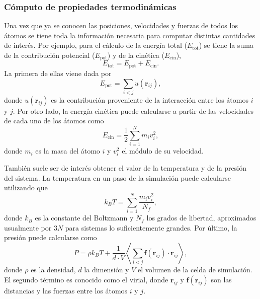

\subsubsection{Cómputo de propiedades termodinámicas}

Una vez que ya se conocen las posiciones, velocidades y fuerzas de todos los 
átomos se tiene toda la información necesaria para computar distintas cantidades 
de interés. Por ejemplo, para el cálculo de la energía total ($E_{\text{tot}}$) 
se tiene la suma de la contribución potencial ($E_{\text{pot}}$) y de la cinética
($E_{\text{cin}}$),
\begin{equation}
    E_{\text{tot}} = E_{\text{pot}} + E_{\text{cin}}.
\end{equation}
La primera de ellas viene dada por 
\begin{equation}
    E_{\text{pot}} = \sum_{i < j} u(\mathbf{r}_{ij}),
\end{equation}
donde $u(\mathbf{r}_{ij})$ es la contribución proveniente de la interacción 
entre los átomos $i$ y $j$. Por otro lado, la energía cinética puede calcularse a
partir de las velocidades de cada uno de los átomos como
\begin{equation}
    E_{\text{cin}} = \frac{1}{2} \sum_{i=1}^{N} m_i v_i^2, 
\end{equation}
donde $m_i$ es la masa del átomo $i$ y $v_i^2$ el módulo de su velocidad. 

También suele ser de interés obtener el valor de la temperatura y de la presión
del sistema. La temperatura en un paso de la simulación puede calcularse 
utilizando que
\begin{equation}\label{eq:tempvel}
    k_B T = \sum_{i=1}^N \frac{m_i v_i^2}{N_f},
\end{equation}
donde $k_B$ es la constante del Boltzmann y $N_f$ los grados de libertad,
aproximados usualmente por $3N$ para sistemas lo suficientemente grandes. Por 
último, la presión puede calcularse como 
\begin{equation}
P = \rho k_B T + \frac{1}{d \cdot V} \left\langle \sum_{i<j} \mathbf{f}(\mathbf{r}_{ij}) \cdot \mathbf{r}_{ij} \right\rangle,
\end{equation}
donde $\rho$ es la densidad, $d$ la dimensión y $V$ el volumen de la celda de 
simulación. El segundo término es conocido como el virial, donde $\mathbf{r}_{ij}$ 
y $\mathbf{f}(\mathbf{r}_{ij})$ son las distancias y las fuerzas entre los átomos $i$ y $j$.


